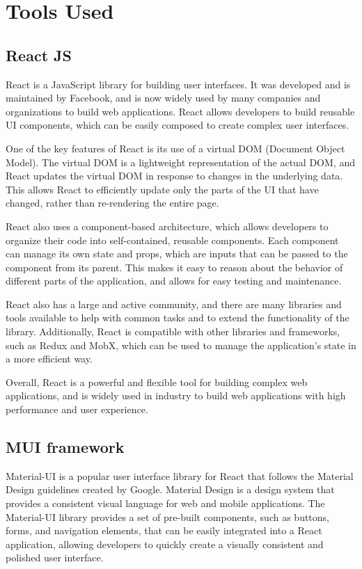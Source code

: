 \chapter{Tools Used}
\section{React JS}
React is a JavaScript library for building user interfaces. It was developed and is maintained by Facebook, and is now widely used by many companies and organizations to build web applications. React allows developers to build reusable UI components, which can be easily composed to create complex user interfaces.

One of the key features of React is its use of a virtual DOM (Document Object Model). The virtual DOM is a lightweight representation of the actual DOM, and React updates the virtual DOM in response to changes in the underlying data. This allows React to efficiently update only the parts of the UI that have changed, rather than re-rendering the entire page.

React also uses a component-based architecture, which allows developers to organize their code into self-contained, reusable components. Each component can manage its own state and props, which are inputs that can be passed to the component from its parent. This makes it easy to reason about the behavior of different parts of the application, and allows for easy testing and maintenance.

React also has a large and active community, and there are many libraries and tools available to help with common tasks and to extend the functionality of the library. Additionally, React is compatible with other libraries and frameworks, such as Redux and MobX, which can be used to manage the application's state in a more efficient way.

Overall, React is a powerful and flexible tool for building complex web applications, and is widely used in industry to build web applications with high performance and user experience.
\section{MUI framework }
Material-UI is a popular user interface library for React that follows the Material Design guidelines created by Google. Material Design is a design system that provides a consistent visual language for web and mobile applications. The Material-UI library provides a set of pre-built components, such as buttons, forms, and navigation elements, that can be easily integrated into a React application, allowing developers to quickly create a visually consistent and polished user interface.

